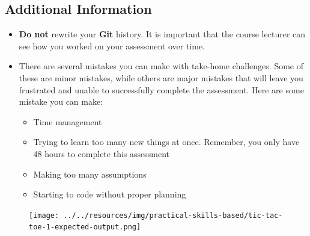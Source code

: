\documentclass{article}
\begin{document}
\subsection*{Additional Information}
\begin{itemize}
	\item \textbf{Do not} rewrite your \textbf{Git} history. It is important that the course lecturer can see how you worked on your assessment over time.
	\item There are several mistakes you can make with take-home challenges. Some of these are minor mistakes, while others are major mistakes that will leave you frustrated and unable to successfully complete the assessment. Here are some mistake you can make: 
	      \begin{itemize}
	      	\item Time management
	      	\item Trying to learn too many new things at once. Remember, you only have 48 hours to complete this assessment
	      	\item Making too many assumptions
	      	\item Starting to code without proper planning
	      \end{itemize}
\end{itemize}

\newpage

\begin{figure}
	\centering
	\texttt{[image: ../../resources/img/practical-skills-based/tic-tac-toe-1-expected-output.png]}
\end{figure}
\end{document}
